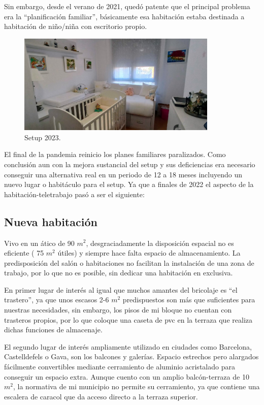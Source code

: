 Sin embargo, desde el verano de 2021, quedó patente que el principal problema era la “planificación familiar”, básicamente esa habitación estaba destinada a habitación de niño/niña con escritorio propio.
\begin{figure}[htb]
\begin{center}
\includegraphics[width=0.85\textwidth]{./figuras/setup_bebe.jpg}
\caption{Setup 2023.}
\label{F:setup_bebe}
\end{center}
\end{figure}
El final de la pandemia reinicio los planes familiares paralizados. Como conclusión aun con la mejora sustancial del setup y sus deficiencias era necesario conseguir una alternativa real en un periodo de 12 a 18 meses incluyendo un nuevo lugar o habitáculo para el setup. Ya que a finales de 2022 el aspecto de la habitación-teletrabajo pasó a ser el siguiente:


\subsection{Nueva habitación}\label{S:nueva_room}
Vivo en un ático de 90 {\rm$m^{2}$}, desgraciadamente la disposición espacial no es eficiente ( 75 {\rm$m^{2}$} útiles) y siempre hace falta espacio de almacenamiento. La predisposición del salón o habitaciones no facilitan la instalación de una zona de trabajo, por lo que no es posible, sin dedicar una habitación en exclusiva.

En primer lugar de interés al igual que muchos amantes del bricolaje es “el trastero”, ya que unos escasos 2-6 {\rm$m^{2}$} predispuestos son más que suficientes para nuestras necesidades, sin embargo, los pisos de mi bloque no cuentan con trasteros propios, por lo que coloque una caseta de pvc en la terraza que realiza dichas funciones de almacenaje.

El segundo lugar de interés ampliamente utilizado en ciudades como Barcelona, Castelldefels o Gava, son los balcones y galerías. Espacio estrechos pero alargados fácilmente convertibles mediante cerramiento de aluminio acristalado para conseguir un espacio extra. Aunque cuento con un amplio balcón-terraza de 10 {\rm$m^{2}$}, la normativa de mi municipio no permite su cerramiento, ya que contiene una escalera de caracol que da acceso directo a la terraza superior.

